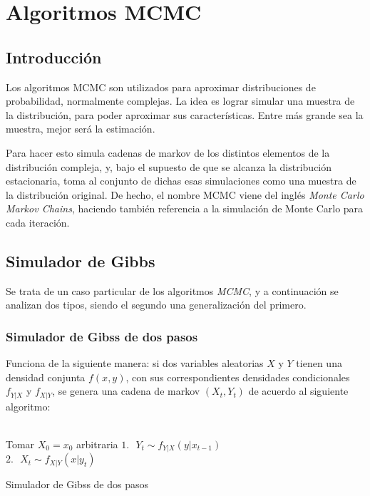 \chapter[Algoritmos MCMC]{Algoritmos MCMC}\label{chap:MCMC}

\section {Introducci\'on}

Los algoritmos MCMC son utilizados para aproximar distribuciones de probabilidad, normalmente complejas. La idea es lograr simular una muestra de la distribuci\'on, para poder aproximar sus caracter\'isticas. Entre m\'as grande sea la muestra, mejor ser\'a la estimaci\'on.

Para hacer esto simula cadenas de markov de los distintos elementos de la distribuci\'on compleja, y, bajo el supuesto de que se alcanza la distribuci\'on estacionaria, toma al conjunto de dichas esas simulaciones como una muestra de la distribuci\'on original. De hecho, el nombre MCMC viene del ingl\'es \textit{Monte Carlo Markov Chains}, haciendo tambi\'en referencia a la simulaci\'on de Monte Carlo para cada iteraci\'on.

\section{Simulador de Gibbs}

Se trata de un caso particular de los algoritmos \textit{MCMC}, y a continuaci\'on se analizan dos tipos, siendo el segundo una generalizaci\'on del primero.

\subsection{Simulador de Gibss de dos pasos}

Funciona de la siguiente manera: si dos variables aleatorias $X$ y $Y$ tienen una densidad conjunta $f(x,y)$, con sus correspondientes densidades condicionales $f_{Y|X}$ y $f_{X|Y}$, se genera una cadena de markov $(X_t,Y_t)$ de acuerdo al siguiente algoritmo:
\\ \\
\begin{algorithm}[H]
 {Tomar $X_0 = x_0$ arbitraria \;
     {
        $1. \text{ } Y_t \sim f_{Y|X}(y|x_{t-1})\;$\\
        $2. \text{ } X_t \sim f_{X|Y}(x|y_{t})\;$
     }
 }
 \caption{Simulador de Gibss de dos pasos}
\end{algorithm}
\BlankLine

